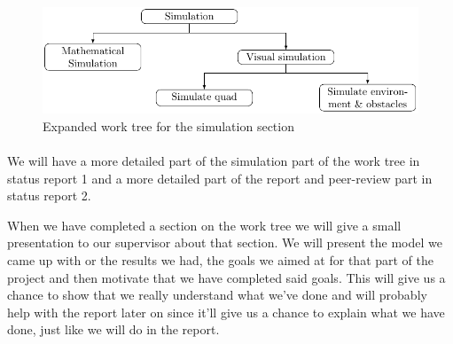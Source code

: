 \documentclass{article}
\begin{document}
		\begin{figure}[H]
			\centering
			\includegraphics[width=.8\linewidth]{Workplan_work_tree/simulation_work_tree_diagram}
			\caption{Expanded work tree for the simulation section}
		\end{figure}
		
		\paragraph{} We will have a more detailed part of the simulation part of the work tree in status report 1 and a more detailed part of the report and peer-review part in status report 2.
		
		\vspace{1em}
		When we have completed a section on the work tree we will give a small presentation to our supervisor about that section. We will present the model we came up with or the results we had, the goals we aimed at for that part of the project and then motivate that we have completed said goals. This will give us a chance to show that we really understand what we've done and will probably help with the report later on since it'll give us a chance to explain what we have done, just like we will do in the report.  
			

	
\end{document}
